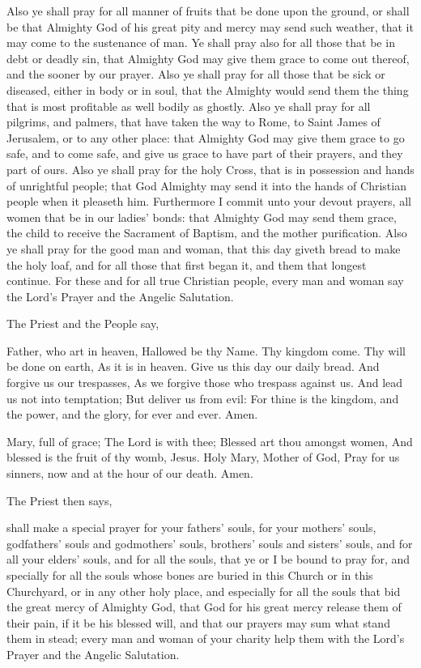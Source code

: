 Also ye shall pray for all manner of fruits that be done upon the ground, or shall be that Almighty God of his great pity and mercy may send such weather, that it may come to the sustenance of man. Ye shall pray also for all those that be in debt or deadly sin, that Almighty God may give them grace to come out thereof, and the sooner by our prayer. Also ye shall pray for all those that be sick or diseased, either in body or in soul, that the Almighty would send them the thing that is most profitable as well bodily as ghostly. Also ye shall pray for all pilgrims, and palmers, that have taken the way to Rome, to Saint James of Jerusalem, or to any other place: that Almighty God may give them grace to go safe, and to come safe, and give us grace to have part of their prayers, and they part of ours. Also ye shall pray for the holy Cross, that is in possession and hands of unrightful people; that God Almighty may send it into the hands of Christian people when it pleaseth him. Furthermore I commit unto your devout prayers, all women that be in our ladies' bonds: that Almighty God may send them grace, the child to receive the Sacrament of Baptism, and the mother purification. Also ye shall pray for the good man and woman, that this day giveth bread to make the holy loaf, and for all those that first began it, and them that longest continue. For these and for all true Christian people, every man and woman say the Lord's Prayer and the Angelic Salutation.
\begin{rubric}
    The Priest and the People say,
\end{rubric}
 Father, who art in heaven, Hallowed be thy Name. Thy kingdom come. Thy will be done on earth, As it is in heaven. Give us this day our daily bread. And forgive us our trespasses, As we forgive those who trespass against us. And lead us not into temptation; But deliver us from evil: For thine is the kingdom, and the power, and the glory, for ever and ever. Amen.
\par\noindent
{} Mary, full of grace; The Lord is with thee; Blessed art thou amongst women, And blessed is the fruit of thy womb, Jesus. Holy Mary, Mother of God, Pray for us sinners, now and at the hour of our death. Amen.
\begin{rubric}
    The Priest then says,
\end{rubric}
 shall make a special prayer for your fathers' souls, for your mothers' souls, godfathers' souls and godmothers' souls, brothers' souls and sisters' souls, and for all your elders' souls, and for all the souls, that ye or I be bound to pray for, and specially for all the souls whose bones are buried in this Church or in this Churchyard, or in any other holy place, and especially for all the souls that bid the great mercy of Almighty God, that God for his great mercy release them of their pain, if it be his blessed will, and that our prayers may sum what stand them in stead; every man and woman of your charity help them with the Lord's Prayer and the Angelic Salutation.

